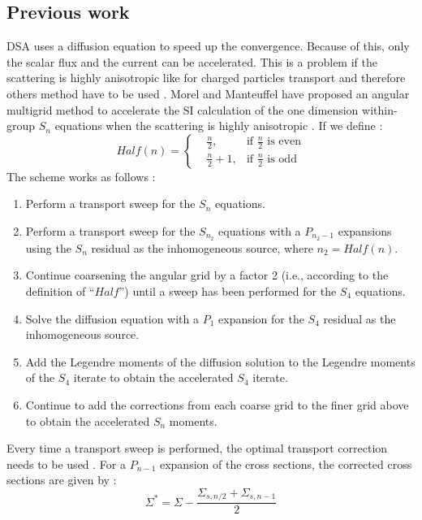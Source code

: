 \subsection{Previous work}
DSA uses a diffusion equation to speed up the convergence. Because of this,
only the scalar flux and the current can be accelerated. This is a problem if
the scattering is highly anisotropic like for charged particles transport and
therefore others method have to be used \cite{kassem,multigrid_1d}. Morel and
Manteuffel have proposed an angular multigrid method to accelerate the SI
calculation of the one dimension within-group $S_n$ equations when the scattering 
is highly anisotropic \cite{multigrid_1d}. If we define :
\begin{equation}
Half(n) = \left\{
\begin{aligned}
&\frac{n}{2}, &\textrm{if $\frac{n}{2}$ is even}\\
&\frac{n}{2}+1, &\textrm{if $\frac{n}{2}$ is odd}
\end{aligned}
\right.
\end{equation}
The scheme works as follows : 
\begin{enumerate}
\item Perform a transport sweep for the $S_n$ equations.
\item Perform a transport sweep for the $S_{n_2}$ equations with a $P_{n_2-1}$
expansions using the $S_n$ residual as the inhomogeneous source, where
$n_2=Half(n)$.
\item Continue coarsening the angular grid by a factor 2 (i.e., according to
the definition of ``$Half$'') until a sweep has been performed for the $S_4$
equations.
\item Solve the diffusion equation with a $P_1$ expansion for the $S_4$
residual as the inhomogeneous source.
\item Add the Legendre moments of the diffusion solution to the Legendre
moments of the $S_4$ iterate to obtain the accelerated $S_4$ iterate.
\item Continue to add the corrections from each coarse grid to the finer grid
above to obtain the accelerated $S_n$ moments.
\end{enumerate}
Every time a transport sweep is performed, the optimal transport correction
needs to be used \cite{multigrid_1d}. For a $P_{n-1}$ expansion of the cross
sections, the corrected cross sections are given by :
\begin{equation}
\Sigma^* = \Sigma -\frac{\Sigma_{s,n/2}+\Sigma_{s,n-1}}{2}
\end{equation}
